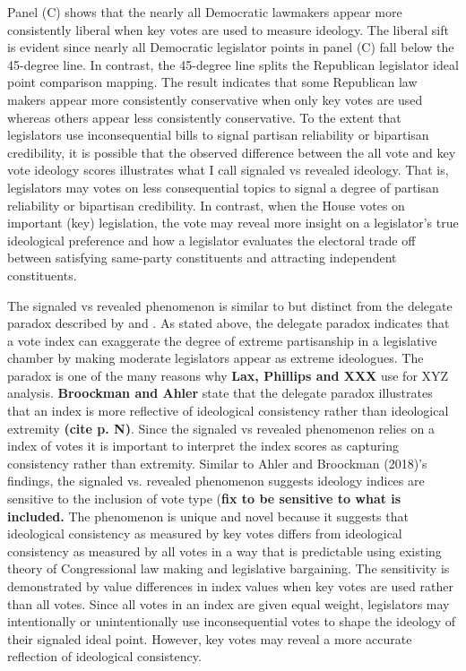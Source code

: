 \documentclass[10pt,letterpaper]{article}
\begin{document}
Panel (C) shows that the nearly all Democratic lawmakers appear more consistently liberal when key votes are used to measure ideology. The liberal sift is evident since nearly all Democratic legislator points in panel (C) fall below the 45-degree line. In contrast, the 45-degree line splits the Republican legislator ideal point comparison mapping. The result indicates that some Republican law makers appear more consistently conservative when only key votes are used whereas others appear less consistently conservative. To the extent that legislators use inconsequential bills to signal partisan reliability or bipartisan credibility, it is possible that the observed difference between the all vote and key vote ideology scores illustrates what I call signaled vs revealed ideology. That is, legislators may votes on less consequential topics to signal a degree of partisan reliability or bipartisan credibility. In contrast, when the House votes on important (key) legislation, the vote may reveal more insight on a legislator's true ideological preference and how a legislator evaluates the electoral trade off between satisfying same-party constituents and attracting independent constituents.

 

The signaled vs revealed phenomenon is similar to but distinct from the delegate paradox described by \cite{Broockman2016} and \cite{Ahler2018}. As stated above, the delegate paradox indicates that a vote index can exaggerate the degree of extreme partisanship in a legislative chamber by making moderate legislators appear as extreme ideologues. The paradox is one of the many reasons why \textbf{Lax, Phillips and XXX} use for XYZ analysis. \textbf{Broockman and Ahler} state that the delegate paradox illustrates that an index is more reflective of ideological consistency rather than ideological extremity \textbf{(cite p. N)}. Since the signaled vs revealed phenomenon relies on a index of votes it is important to interpret the index scores as capturing consistency rather than extremity. Similar to Ahler and Broockman (2018)'s findings, the signaled vs. revealed phenomenon suggests ideology indices are sensitive to the inclusion of vote type (\textbf{fix to be sensitive to what is included.} The phenomenon is unique and novel because it suggests that ideological consistency as measured by key votes differs from ideological consistency as measured by all votes in a way that is predictable using existing theory of Congressional law making and legislative bargaining. The sensitivity is demonstrated by value differences in index values when key votes are used rather than all votes. Since all votes in an index are given equal weight, legislators may intentionally or unintentionally use inconsequential votes to shape the ideology of their signaled ideal point. However, key votes may reveal a more accurate reflection of ideological consistency.
\end{document}
